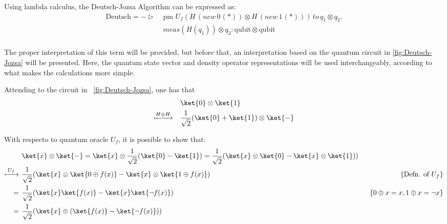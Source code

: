   Using lambda calculus, the Deutsch-Jozsa Algorithm can be expressed as:
  \begin{align*}
  \text{Deutsch} =  - \triangleright & \hspace{3pt} \text{pm} \hspace{4pt}  U_{f}(H  \hspace{2pt}   ( \textit{new}   \hspace{2pt}  0 \hspace{1pt}(*)) \otimes H  \hspace{2pt}   ( \textit{new}   \hspace{2pt}  1 \hspace{1pt}(*))) \hspace{2pt}  \textit{to} \hspace{2pt} q_{1} \otimes q_{2} \hspace{1pt}. \\
  &\hspace{3pt} \textit{meas} (H( q_{1})) \otimes q_{2} : \text{qubit} \otimes \text{qubit}  \\ 
   \end{align*}

The proper interpretation of this term will be provided, but before that, an interpretation based on the quantum circuit in \autoref{fig:Deutsch-Jozsa} will be presented. Here, the quantum state vector and density operator representations will be used interchangeably, according to what makes the calculations more simple.

Attending to the circuit in  \autoref{fig:Deutsch-Jozsa}, one has that
  \begin{equation}
  \begin{split}
   & \ket{0} \otimes \ket{1} \\
   \xmapsto{ H \otimes H} \quad & \frac{1}{\sqrt{2}}(\ket{0} + \ket{1}) \otimes \ket{-} \\
  \end{split}
  \end{equation}
  
  With respecto to  quantum oracle $U_f$, it is possible to show that:
  \begin{equation}
  \begin{split}
    &\ket{x} \otimes \ket{-} =   \ket{x} \otimes \frac{1}{\sqrt{2}}(\ket{0} - \ket{1}) = \frac{1}{\sqrt{2}}(\ket{x} \otimes \ket{0} - \ket{x} \otimes \ket{1})) \\
    \xmapsto{ \hspace{2pt} U_{f} \hspace{2pt}} \hspace{4pt} &  \frac{1}{\sqrt{2}}(\ket{x} \otimes \ket{0 \oplus f(x)} - \ket{x} \otimes \ket{1 \oplus f(x)}) &\hspace{50pt} \{\text{Defn. of } U_f\} \\
    = \hspace{4pt}  & \frac{1}{\sqrt{2}}(\ket{x} \ket{f(x)} - \ket{x} \ket{\neg f(x)}) & \{0\oplus x=x, 1\oplus x = \neg x\} \\
    = \hspace{4pt}  & \frac{1}{\sqrt{2}}(\ket{x} \otimes (\ket{f(x)}-\ket{\neg f(x)}))
   \end{split}
  \end{equation}
  

